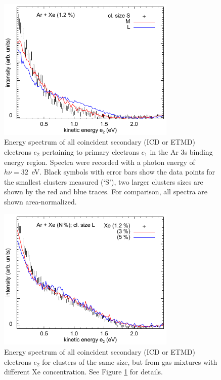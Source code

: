 \begin{figure}[ht]
 \centering
 \includegraphics[width=8.5cm]{pics/figure_icd_12.pdf}
 \caption{
Energy spectrum of all coincident secondary (ICD or ETMD) electrons $e_2$ pertaining to primary electrons $e_1$ in the Ar 3s binding energy region. Spectra were recorded with a photon energy of $h\nu = 32$~eV. Black symbols with error bars show the data points for the smallest clusters measured (`S'), two larger clusters sizes are shown by the red and blue traces. For comparison, all spectra are shown area-normalized. 
}
 \label{figure:icd_12}
\end{figure}


\begin{figure}[ht]
 \centering
 \includegraphics[width=8.5cm]{pics/figure_icd_l.pdf}
 \caption{
Energy spectrum of all coincident secondary (ICD or ETMD) electrons $e_2$ for clusters of the same size, but from gas mixtures with different Xe concentration. See Figure \protect\ref{figure:icd_12} for details.
}
 \label{figure:icd_l}
\end{figure}


